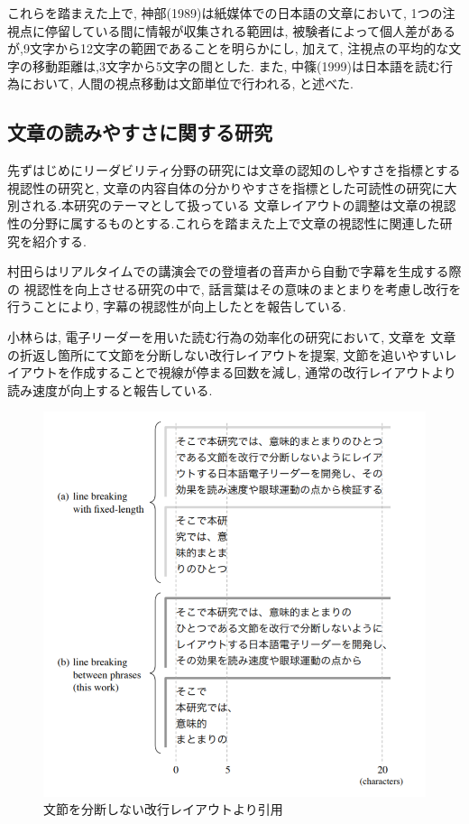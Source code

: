 これらを踏まえた上で, 神部(1989)は紙媒体での日本語の文章において, 1つの注視点に停留している間に情報が収集される範囲は,
被験者によって個人差があるが,9文字から12文字の範囲であることを明らかにし, 
加えて, 注視点の平均的な文字の移動距離は,3文字から5文字の間とした.\cite{神部89}
また, 中篠(1999)は日本語を読む行為において, 人間の視点移動は文節単位で行われる, と述べた.\cite{中條99} 

\subsection{文章の読みやすさに関する研究}

先ずはじめにリーダビリティ分野の研究には文章の認知のしやすさを指標とする視認性の研究と,
文章の内容自体の分かりやすさを指標とした可読性の研究に大別される.本研究のテーマとして扱っている
文章レイアウトの調整は文章の視認性の分野に属するものとする.これらを踏まえた上で文章の視認性に関連した研究を紹介する.

村田らはリアルタイムでの講演会での登壇者の音声から自動で字幕を生成する際の
視認性を向上させる研究の中で, 話言葉はその意味のまとまりを考慮し改行を行うことにより, 
字幕の視認性が向上したとを報告している.\cite{村田09} 

小林らは, 電子リーダーを用いた読む行為の効率化の研究において, 文章を
文章の折返し箇所にて文節を分断しない改行レイアウトを提案, 
文節を追いやすいレイアウトを作成することで視線が停まる回数を減し, 
通常の改行レイアウトより読み速度が向上すると報告している.\cite{小林14} 

\begin{figure}[H]
    \centering
    \label{fig:layout}
    \includegraphics[width=0.6\columnwidth]{image/02/img1.png}
    \caption[文節を分断しない改行レイアウト] {文節を分断しない改行レイアウト\protect\cite{小林14}より引用}
\end{figure}

